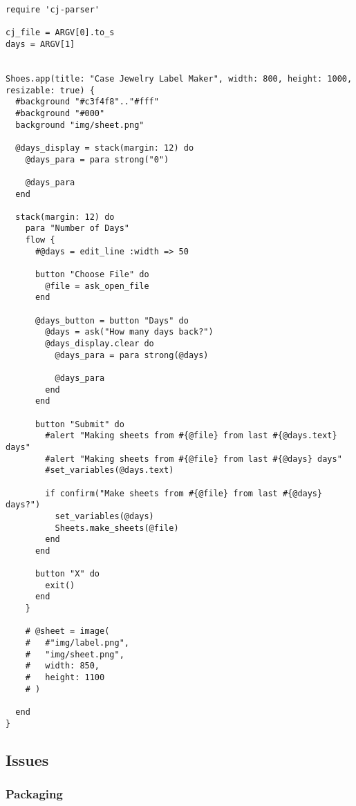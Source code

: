 \documentclass[11pt]{article}
\begin{document}
\begin{verbatim}
require 'cj-parser'

cj_file = ARGV[0].to_s
days = ARGV[1]


Shoes.app(title: "Case Jewelry Label Maker", width: 800, height: 1000, resizable: true) {
  #background "#c3f4f8".."#fff"
  #background "#000"
  background "img/sheet.png"

  @days_display = stack(margin: 12) do
    @days_para = para strong("0")

    @days_para
  end

  stack(margin: 12) do
    para "Number of Days"
    flow {
      #@days = edit_line :width => 50

      button "Choose File" do
        @file = ask_open_file
      end

      @days_button = button "Days" do
        @days = ask("How many days back?")
        @days_display.clear do
          @days_para = para strong(@days)

          @days_para
        end
      end

      button "Submit" do
        #alert "Making sheets from #{@file} from last #{@days.text} days"
        #alert "Making sheets from #{@file} from last #{@days} days"
        #set_variables(@days.text)

        if confirm("Make sheets from #{@file} from last #{@days} days?")
          set_variables(@days)
          Sheets.make_sheets(@file)
        end
      end

      button "X" do
        exit()
      end
    }

    # @sheet = image(
    #   #"img/label.png",
    #   "img/sheet.png",
    #   width: 850,
    #   height: 1100
    # )

  end
}
\end{verbatim}

\subsection{Issues}
\label{sec-3-1}

\subsubsection{Packaging}
\label{sec-3-1-1}
\end{document}
